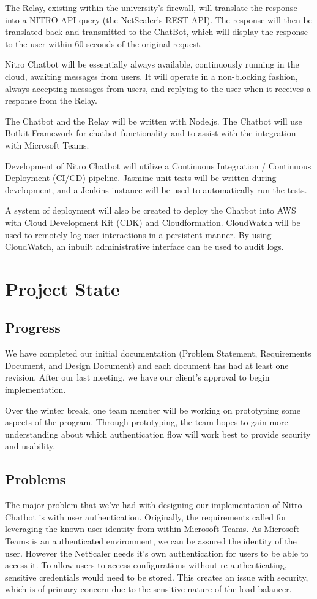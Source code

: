 \documentclass[onecolumn, draftclsnofoot,10pt, compsoc]{IEEEtran}
\begin{document}
The Relay, existing within the university's firewall, will translate the response into a NITRO API query (the NetScaler's REST API).
The response will then be translated back and transmitted to the ChatBot, which will display the response to the user within 60 seconds of the original request.

Nitro Chatbot will be essentially always available, continuously running in the cloud, awaiting messages from users.
It will operate in a non-blocking fashion, always accepting messages from users, and replying to the user when it receives a response from the Relay.

The Chatbot and the Relay will be written with Node.js. The Chatbot will use Botkit Framework for chatbot functionality and to assist with the integration with Microsoft Teams.

Development of Nitro Chatbot will utilize a Continuous Integration / Continuous Deployment (CI/CD) pipeline.
Jasmine unit tests will be written during development, and a Jenkins instance will be used to automatically run the tests.

A system of deployment will also be created to deploy the Chatbot into AWS with Cloud Development Kit (CDK) and Cloudformation.
CloudWatch will be used to remotely log user interactions in a persistent manner. By using CloudWatch, an inbuilt administrative interface can be used to audit logs.

\section{Project State}
\subsection{Progress}
We have completed our initial documentation (Problem Statement, Requirements Document, and Design Document) and each document has had at least one revision.
After our last meeting, we have our client's approval to begin implementation.

Over the winter break, one team member will be working on prototyping some aspects of the program.
Through prototyping, the team hopes to gain more understanding about which authentication flow will work best to provide security and usability.

\subsection{Problems}
The major problem that we've had with designing our implementation of Nitro Chatbot is with user authentication.
Originally, the requirements called for leveraging the known user identity from within Microsoft Teams.
As Microsoft Teams is an authenticated environment, we can be assured the identity of the user.
However the NetScaler needs it's own authentication for users to be able to access it.
To allow users to access configurations without re-authenticating, sensitive credentials would need to be stored.
This creates an issue with security, which is of primary concern due to the sensitive nature of the load balancer.
\end{document}
